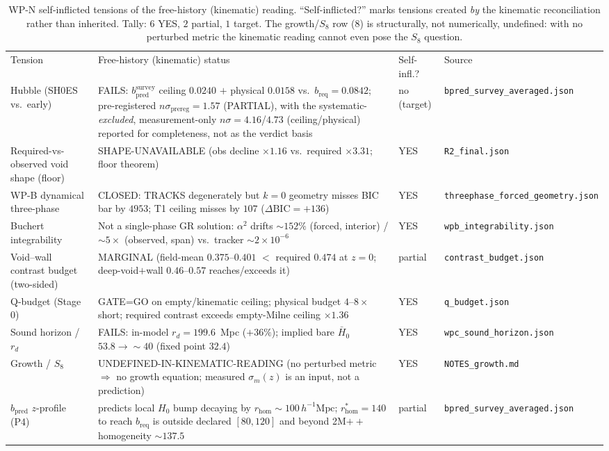 \documentclass[aps,prd,twocolumn,nofootinbib,superscriptaddress,floatfix]{revtex4-2}
\newcommand{\Ho}{H_{0}}
\newcommand{\Hbaro}{\bar H_{0}}
\newcommand{\dBIC}{\Delta\mathrm{BIC}}
\newcommand{\rd}{r_{d}}
\newcommand{\bpred}{b_{\mathrm{pred}}}
\newcommand{\breq}{b_{\mathrm{req}}}
\newcommand{\hmpc}{\,h^{-1}\mathrm{Mpc}}
\begin{document}
\begin{table}[t]
\caption{WP-N self-inflicted tensions of the free-history (kinematic) reading.
``Self-inflicted?'' marks tensions created \emph{by} the kinematic
reconciliation rather than inherited. Tally: $6$ YES, $2$ partial, $1$ target.
The growth/$S_8$ row (8) is structurally, not numerically, undefined: with no
perturbed metric the kinematic reading cannot even pose the $S_8$ question.}
\label{tab:wpn}
\begin{ruledtabular}
\begin{tabular}{p{}p{}p{}p{}}
Tension & Free-history (kinematic) status & Self-infl.? & Source\\
\colrule
Hubble (SH0ES vs.\ early) &
FAILS: $\bpred^{\mathrm{survey}}$ ceiling $0.0240$ $+$ physical $0.0158$ vs.\
$\breq=0.0842$; pre-registered $n\sigma_{\mathrm{prereg}}=1.57$ (PARTIAL), with the
systematic-\emph{excluded}, measurement-only $n\sigma=4.16$/$4.73$ (ceiling/physical)
reported for completeness, not as the verdict basis &
no (target) & \texttt{bpred\_survey\_averaged.json}\\
Required-vs-observed void shape (floor) &
SHAPE-UNAVAILABLE (obs decline $\times1.16$ vs.\ required $\times3.31$; floor
theorem) & YES & \texttt{R2\_final.json}\\
WP-B dynamical three-phase &
CLOSED: TRACKS degenerately but $k=0$ geometry misses BIC bar by $4953$; T1
ceiling misses by $107$ ($\dBIC=+136$) & YES & \texttt{threephase\_forced\_geometry.json}\\
Buchert integrability &
Not a single-phase GR solution: $\alpha^2$ drifts $\sim\!152\%$ (forced,
interior) / $\sim\!5\times$ (observed, span) vs.\ tracker $\sim\!2\times10^{-6}$ &
YES & \texttt{wpb\_integrability.json}\\
Void--wall contrast budget (two-sided) &
MARGINAL (field-mean $0.375$--$0.401$ $<$ required $0.474$ at $z=0$;
deep-void$+$wall $0.46$--$0.57$ reaches/exceeds it) & partial &
\texttt{contrast\_budget.json}\\
Q-budget (Stage 0) &
GATE=GO on empty/kinematic ceiling; physical budget $4$--$8\times$ short;
required contrast exceeds empty-Milne ceiling $\times1.36$ & YES &
\texttt{q\_budget.json}\\
Sound horizon / $\rd$ &
FAILS: in-model $\rd=199.6$~Mpc ($+36\%$); implied bare $\Hbaro$
$53.8\to\sim\!40$ (fixed point $32.4$) & YES & \texttt{wpc\_sound\_horizon.json}\\
Growth / $S_8$ &
UNDEFINED-IN-KINEMATIC-READING (no perturbed metric $\Rightarrow$ no growth
equation; measured $\sigma_m(z)$ is an input, not a prediction) & YES &
\texttt{NOTES\_growth.md}\\
$\bpred$ $z$-profile (P4) &
predicts local $\Ho$ bump decaying by $r_{\mathrm{hom}}\sim\!100\hmpc$;
$r_{\mathrm{hom}}^{\ast}=140$ to reach $\breq$ is outside declared $[80,120]$ and
beyond 2M$++$ homogeneity $\sim\!137.5$ & partial &
\texttt{bpred\_survey\_averaged.json}\\
\end{tabular}
\end{ruledtabular}
\end{table}
\end{document}
